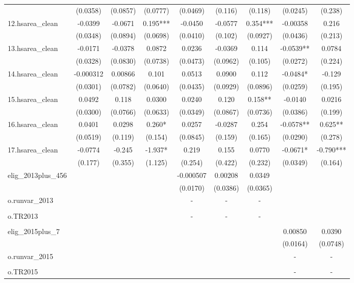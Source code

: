 \documentclass[]{article}
\begin{document}
\begin{tabular}{lcccccccc}
 & (0.0358) & (0.0857) & (0.0777) & (0.0469) & (0.116) & (0.118) & (0.0245) & (0.238) \\
12.hsarea\_clean & -0.0399 & -0.0671 & 0.195*** & -0.0450 & -0.0577 & 0.354*** & -0.00358 & 0.216 \\
 & (0.0348) & (0.0894) & (0.0698) & (0.0410) & (0.102) & (0.0927) & (0.0436) & (0.213) \\
13.hsarea\_clean & -0.0171 & -0.0378 & 0.0872 & 0.0236 & -0.0369 & 0.114 & -0.0539** & 0.0784 \\
 & (0.0328) & (0.0830) & (0.0738) & (0.0473) & (0.0962) & (0.105) & (0.0272) & (0.224) \\
14.hsarea\_clean & -0.000312 & 0.00866 & 0.101 & 0.0513 & 0.0900 & 0.112 & -0.0484* & -0.129 \\
 & (0.0301) & (0.0782) & (0.0640) & (0.0435) & (0.0929) & (0.0896) & (0.0259) & (0.195) \\
15.hsarea\_clean & 0.0492 & 0.118 & 0.0300 & 0.0240 & 0.120 & 0.158** & -0.0140 & 0.0216 \\
 & (0.0300) & (0.0766) & (0.0633) & (0.0349) & (0.0867) & (0.0736) & (0.0386) & (0.199) \\
16.hsarea\_clean & 0.0401 & 0.0298 & 0.260* & 0.0257 & -0.0287 & 0.254 & -0.0578** & 0.625** \\
 & (0.0519) & (0.119) & (0.154) & (0.0845) & (0.159) & (0.165) & (0.0290) & (0.278) \\
17.hsarea\_clean & -0.0774 & -0.245 & -1.937* & 0.219 & 0.155 & 0.0770 & -0.0671* & -0.790*** \\
 & (0.177) & (0.355) & (1.125) & (0.254) & (0.422) & (0.232) & (0.0349) & (0.164) \\
elig\_2013plus\_456 &  &  &  & -0.000507 & 0.00208 & 0.0349 &  &  \\
 &  &  &  & (0.0170) & (0.0386) & (0.0365) &  &  \\
o.runvar\_2013 &  &  &  & - & - & - &  &  \\
 &  &  &  &  &  &  &  &  \\
o.TR2013 &  &  &  & - & - & - &  &  \\
 &  &  &  &  &  &  &  &  \\
elig\_2015plus\_7 &  &  &  &  &  &  & 0.00850 & 0.0390 \\
 &  &  &  &  &  &  & (0.0164) & (0.0748) \\
o.runvar\_2015 &  &  &  &  &  &  & - & - \\
 &  &  &  &  &  &  &  &  \\
o.TR2015 &  &  &  &  &  &  & - & - \\

\end{tabular}
\end{document}
